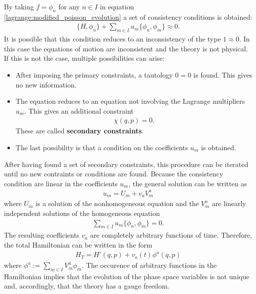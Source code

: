     \begin{property}
        By taking $f=\phi_n$ for any $n\in I$ in equation \ref{lagrange:modified_poisson_evolution} a set of consistency conditions is obtained:
        \begin{gather}
            \{H,\phi_n\} + \sum_{m\in I}u_m\{\phi_n,\phi_m\} \approx 0.
        \end{gather}
        It is possible that this condition reduces to an inconsistency of the type $1\approx0$. In this case the equations of motion are inconsistent and the theory is not physical. If this is not the case, multiple possibilities can arise:
        \begin{itemize}
            \item After imposing the primary constraints, a tautology $0=0$ is found. This gives no new information.
            \item The equation reduces to an equation not involving the Lagrange multipliers $u_m$. This gives an additional constraint
                \begin{gather}
                    \chi(q,p)=0.
                \end{gather}
                These are called \textbf{secondary constraints}.
            \item The last possibility is that a condition on the coefficients $u_m$ is obtained.
        \end{itemize}
        After having found a set of secondary constraints, this procedure can be iterated until no new contraints or conditions are found. Because the consistency condition are linear in the coefficients $u_m$, the general solution can be written as
        \begin{gather}
            u_m = U_m + v_aV^a _m
        \end{gather}
        where $U_m$ is a solution of the nonhomogeneous equation and the $V^a_m$ are linearly independent solutions of the homogeneous equation
        \begin{gather}
            \sum_{m\in I}u_m\{\phi_n,\phi_m\} = 0.
        \end{gather}
        The resulting coefficients $v_a$ are completely arbitrary functions of time. Therefore, the total Hamiltonian can be written in the form
        \begin{gather}
            H_T = H'(q,p) + v_a(t)\phi^a(q,p)
        \end{gather}
        where $\phi^a := \sum_{m\in I}V^a_m\phi_m$. The occurence of arbitrary functions in the Hamiltonian implies that the evolution of the phase space variables is not unique and, accordingly, that the theory has a gauge freedom.
    \end{property}

